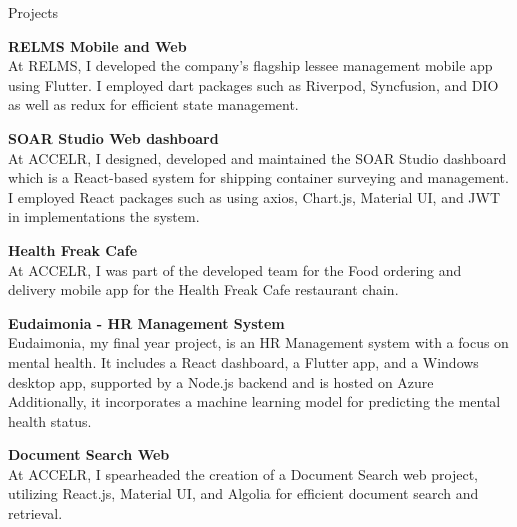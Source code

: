 \documentclass[
	11pt, %
]{./assets/resume} %
\begin{document}

\begin{rSection}{Projects}

	\textbf{RELMS Mobile and Web} \\
	At RELMS, I developed the company's flagship lessee management mobile app using Flutter. I employed dart packages such as Riverpod, Syncfusion, and DIO as well as redux for efficient state management.

	\textbf{SOAR Studio Web dashboard} \\
	At ACCELR, I designed, developed and maintained the SOAR Studio dashboard which is a React-based system for shipping container surveying and management.  I employed React packages such as using axios, Chart.js, Material UI, and JWT in implementations the system.

	\textbf{Health Freak Cafe} \\
	At ACCELR, I was part of the developed team for the Food ordering and delivery mobile app for the Health Freak Cafe restaurant chain.

	\textbf{Eudaimonia - HR Management System} \\
	Eudaimonia, my final year project, is an HR Management system with a focus on mental health. It includes a React dashboard, a Flutter app, and a Windows desktop app, supported by a Node.js backend and is hosted on Azure Additionally, it incorporates a machine learning model for predicting the mental health status.

	\textbf{Document Search Web} \\
	At ACCELR, I spearheaded the creation of a Document Search web project, utilizing React.js, Material UI, and Algolia for efficient document search and retrieval.

\end{rSection}




\end{document}
